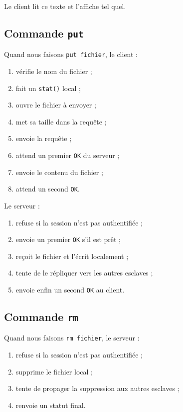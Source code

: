 \documentclass[a4paper,11pt]{article}
\begin{document}
Le client lit ce texte et l'affiche tel quel.

\subsection{Commande \texttt{put}}

Quand nous faisons \texttt{put fichier}, le client :

\begin{enumerate}[leftmargin=*]
    \item vérifie le nom du fichier ;
    \item fait un \texttt{stat()} local ;
    \item ouvre le fichier à envoyer ;
    \item met sa taille dans la requête ;
    \item envoie la requête ;
    \item attend un premier \texttt{OK} du serveur ;
    \item envoie le contenu du fichier ;
    \item attend un second \texttt{OK}.
\end{enumerate}

Le serveur :

\begin{enumerate}[leftmargin=*]
    \item refuse si la session n'est pas authentifiée ;
    \item envoie un premier \texttt{OK} s'il est prêt ;
    \item reçoit le fichier et l'écrit localement ;
    \item tente de le répliquer vers les autres esclaves ;
    \item envoie enfin un second \texttt{OK} au client.
\end{enumerate}

\subsection{Commande \texttt{rm}}

Quand nous faisons \texttt{rm fichier}, le serveur :

\begin{enumerate}[leftmargin=*]
    \item refuse si la session n'est pas authentifiée ;
    \item supprime le fichier local ;
    \item tente de propager la suppression aux autres esclaves ;
    \item renvoie un statut final.
\end{enumerate}
\end{document}
